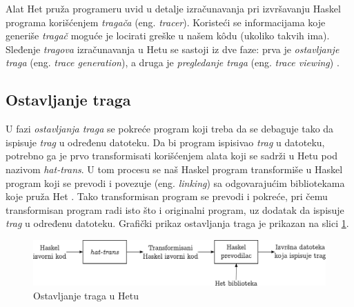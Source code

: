 \documentclass[a4paper]{article}
\begin{document}
{{Alat Het pruža programeru uvid u detalje izračunavanja pri izvršavanju Haskel programa korišćenjem {\em tragača} (eng. {\em tracer}). 
Koristeći se informacijama koje generiše {\em tragač} moguće je locirati greške u našem k\^{o}du (ukoliko takvih ima).
Sleđenje {\em tragova} izračunavanja u Hetu se sastoji iz dve faze: prva je {\em ostavljanje traga} (eng. {\em trace generation}), a druga je {\em pregledanje traga} (eng. {\em trace viewing}) \cite{chitil2002transforming}.

\subsection{Ostavljanje traga}
U fazi {\em ostavljanja traga} se pokreće program koji treba da se debaguje tako da ispisuje {\em trag} u određenu datoteku. Da bi program ispisivao {\em trag} u datoteku,
potrebno ga je prvo transformisati korišćenjem alata koji se sadrži u Hetu pod nazivom {\em hat-trans}. U tom procesu se naš Haskel program transformiše u
Haskel program koji se prevodi i povezuje (eng. {\em linking}) sa odgovarajućim bibliotekama koje pruža Het \cite{chitil2002transforming}. Tako transformisan program se prevodi i pokreće,
pri čemu transformisan program radi isto što i originalni program, uz dodatak da ispisuje {\em trag} u određenu datoteku. %
Grafički prikaz ostavljanja traga je prikazan na slici \ref{fig:hat-trans}.

\begin{figure}[h!]
\begin{center}
\includegraphics[scale=0.55]{hat-trans_graf.png}
\end{center}
\caption{Ostavljanje traga u Hetu}
\label{fig:hat-trans}
\end{figure}

}}
\end{document}
